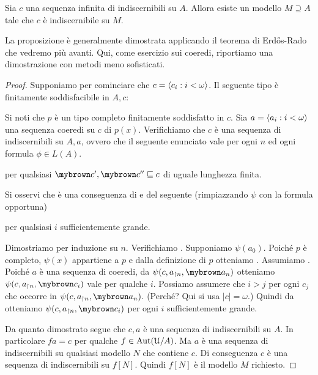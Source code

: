 \begin{proposition}
Sia $c$ una sequenza infinita di indiscernibili su $A$. Allora esiste un modello $M\supseteq A$ tale che $c$ \`e indiscernibile su $M$.
\end{proposition}

La proposizione \`e generalmente dimostrata applicando il teorema di Erd\H{o}s-Rado che vedremo pi\`u avanti. Qui, come esercizio sui coeredi, riportiamo una dimostrazione con metodi meno sofisticati. 

\begin{proof}
Supponiamo per cominciare che $c=\langle c_i:i<\omega\rangle$. Il seguente tipo \`e finitamente soddisfacibile in $A,c$:


Si noti che $p$ \`e un tipo completo finitamente soddisfatto in $c$. Sia $a=\langle a_i:i<\omega\rangle$ una sequenza coeredi su $c$ di $p(x)$. Verifichiamo che $c$ \`e una sequenza di indiscernibili su $A,a$, ovvero che il seguente enunciato  vale per ogni $n$ ed ogni formula $\phi\in L(A)$. 

 per qualsiasi ${\mr{c'}}, {\mr{c''}}\sqsubseteq c$ di uguale lunghezza finita.

Si osservi che  \`e una conseguenza di  e del seguente  (rimpiazzando $\psi$ con la formula opportuna)

 per qualsiasi $i$ sufficientemente grande.

Dimostriamo  per induzione su $n$. Verifichiamo . Supponiamo $\psi(a_0)$. Poich\'e $p$ \`e completo, $\psi(x)$ appartiene a $p$ e dalla definizione di $p$ otteniamo . Assumiamo . Poich\'e $a$ \`e una sequenza di coeredi, da $\psi(c,a_{\restriction n},{\mr{a_n}})$ otteniamo $\psi(c,a_{\restriction n},{\mr{c_i}})$ vale per qualche $i$. Possiamo assumere che $i>j$ per ogni $c_j$ che occorre in $\psi(c,a_{\restriction n},{\mr{a_n}})$. (Perch\'e? Qui si usa $|c|=\omega$.) Quindi da  otteniamo $\psi(c,a_{\restriction n},{\mr{c_i}})$  per ogni $i$ sufficientemente grande.

Da quanto dimostrato segue che $c,a$ \`e una sequenza di indiscernibili su $A$. In particolare $fa=c$ per qualche $f\in\textrm{Aut}(\EuScript U/A)$. Ma $a$ \`e una sequenza di indiscernibili su qualsiasi modello $N$ che contiene $c$. Di conseguenza $c$ \`e una sequenza di indiscernibili su $f[N]$. Quindi $f[N]$ \`e il modello $M$ richiesto. 
\end{proof}

